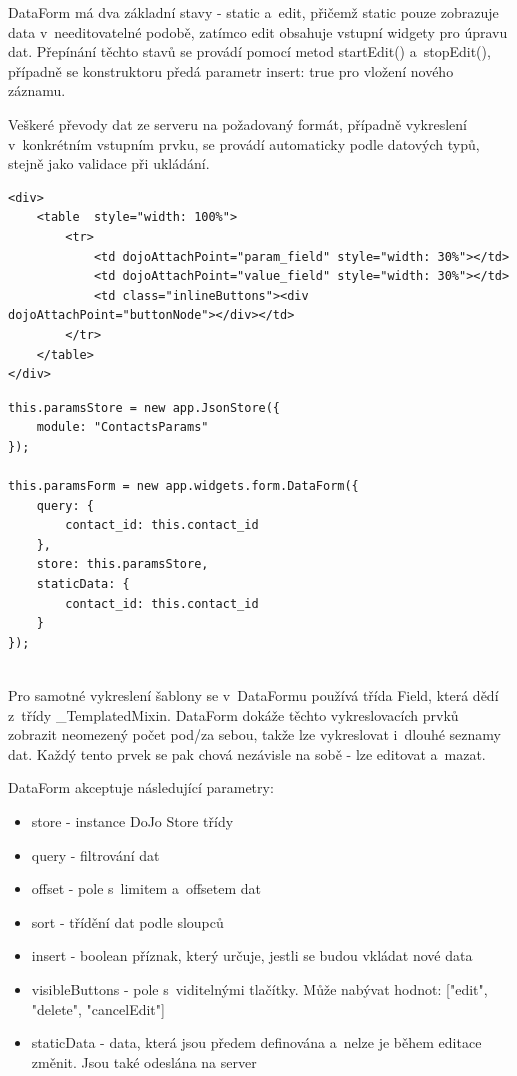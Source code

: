 \documentclass[bc,male,html,dept460]{diploma}				%
\begin{document}
DataForm má dva základní stavy - static a~edit, přičemž static pouze zobrazuje data v~needitovatelné podobě, zatímco edit obsahuje vstupní widgety pro úpravu dat.
Přepínání těchto stavů se provádí pomocí metod startEdit() a~stopEdit(), případně se konstruktoru předá parametr insert: true pro vložení nového záznamu.

Veškeré převody dat ze serveru na požadovaný formát, případně vykreslení v~konkrétním vstupním prvku, se provádí automaticky podle datových typů, stejně jako validace při ukládání.
\newpage
\begin{lstlisting}[label=src:html,caption=Příklad definice šablony]
<div>
	<table  style="width: 100%">
		<tr>
			<td dojoAttachPoint="param_field" style="width: 30%"></td>
			<td dojoAttachPoint="value_field" style="width: 30%"></td>
			<td class="inlineButtons"><div dojoAttachPoint="buttonNode"></div></td>
		</tr>
	</table>
</div>
\end{lstlisting}

\begin{lstlisting}[label=src:JavaScript,caption=Příklad použítí DataForm]
this.paramsStore = new app.JsonStore({
	module: "ContactsParams"
});

this.paramsForm = new app.widgets.form.DataForm({
	query: {
		contact_id: this.contact_id
	},
	store: this.paramsStore,
	staticData: {
		contact_id: this.contact_id
	}
});
 
\end{lstlisting}

Pro samotné vykreslení šablony se v~DataFormu používá třída Field, která dědí z~třídy \_TemplatedMixin. DataForm dokáže těchto vykreslovacích prvků zobrazit neomezený počet pod/za sebou, takže lze vykreslovat i~dlouhé seznamy dat. Každý tento prvek se pak chová nezávisle na sobě - lze editovat a~mazat.

DataForm akceptuje následující parametry:
\begin{itemize}
 \item store - instance DoJo Store třídy
 \item query - filtrování dat
 \item offset - pole s~limitem a~offsetem dat
 \item sort - třídění dat podle sloupců
 \item insert - boolean příznak, který určuje, jestli se budou vkládat nové data
 \item visibleButtons - pole s~viditelnými tlačítky. Může nabývat hodnot: ["edit", "delete", "cancelEdit"]
 \item staticData - data, která jsou předem definována a~nelze je během editace změnit. Jsou také odeslána na server
\end{itemize}
\end{document}
